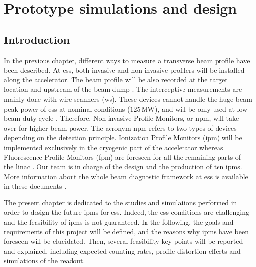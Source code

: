 \chapter{Prototype simulations and design}
\cleardoublepage
\minitoc
\section{Introduction}
\begin{refsection}
  \label{ch3:Introduction}
  In the previous chapter, different ways to measure a transverse beam profile have been described. At \acrshort{ess}, both invasive and non-invasive profilers will be installed along the accelerator. The beam profile will be also recorded at the target location and upstream of the beam dump \cite{shea2013}. The interceptive measurements are mainly done with wire scanners (\acrshort{ws}). These devices cannot handle the huge beam peak power of \acrshort{ess} at nominal conditions ($125\,\mathrm{MW}$), and will be only used at low beam duty cycle \cite{Cheymol2013}. Therefore, Non invasive Profile Monitors, or \acrshort{npm}, will take over for higher beam power. The acronym \acrshort{npm} refers to two types of devices depending on the detection principle. Ionization Profile Monitors (\acrshort{ipm}) will be implemented exclusively in the cryogenic part of the accelerator whereas Fluorescence Profile Monitors (\acrshort{fpm}) are foreseen for all the remaining parts of the linac \cite{Thomas2016}. Our team is in charge of the design and the production of ten \acrshort{ipm}s. More information about the whole beam diagnostic framework at \acrshort{ess} is available in these documents \cite{Peggs2013,Shea:IBIC2017-MO2AB2}.

  The present chapter is dedicated to the studies and simulations performed in order to design the future \acrshort{ipm}s for \acrshort{ess}. Indeed, the \acrshort{ess} conditions are challenging and the feasibility of \acrshort{ipm}s is not guaranteed. In the following, the goals and requirements of this project will be defined, and the reasons why \acrshort{ipm}s have been foreseen will be elucidated. Then, several feasibility key-points will be reported and explained, including expected counting rates, profile distortion effects and simulations of the readout.


\end{refsection}
